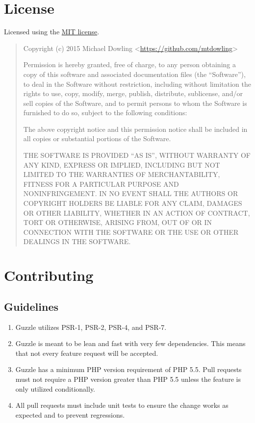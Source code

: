 \documentclass[a4paper,11pt,spanish]{sphinxmanual}
\begin{document}
\chapter{License}
\label{\detokenize{overview:license}}
Licensed using the \href{http://opensource.org/licenses/MIT}{MIT license}.
\begin{quote}

Copyright (c) 2015 Michael Dowling \textless{}\url{https://github.com/mtdowling}\textgreater{}

Permission is hereby granted, free of charge, to any person obtaining a copy
of this software and associated documentation files (the ``Software''), to deal
in the Software without restriction, including without limitation the rights
to use, copy, modify, merge, publish, distribute, sublicense, and/or sell
copies of the Software, and to permit persons to whom the Software is
furnished to do so, subject to the following conditions:

The above copyright notice and this permission notice shall be included in
all copies or substantial portions of the Software.

THE SOFTWARE IS PROVIDED ``AS IS'', WITHOUT WARRANTY OF ANY KIND, EXPRESS OR
IMPLIED, INCLUDING BUT NOT LIMITED TO THE WARRANTIES OF MERCHANTABILITY,
FITNESS FOR A PARTICULAR PURPOSE AND NONINFRINGEMENT. IN NO EVENT SHALL THE
AUTHORS OR COPYRIGHT HOLDERS BE LIABLE FOR ANY CLAIM, DAMAGES OR OTHER
LIABILITY, WHETHER IN AN ACTION OF CONTRACT, TORT OR OTHERWISE, ARISING FROM,
OUT OF OR IN CONNECTION WITH THE SOFTWARE OR THE USE OR OTHER DEALINGS IN
THE SOFTWARE.
\end{quote}


\chapter{Contributing}
\label{\detokenize{overview:contributing}}

\section{Guidelines}
\label{\detokenize{overview:guidelines}}\begin{enumerate}
\item {} 
Guzzle utilizes PSR-1, PSR-2, PSR-4, and PSR-7.

\item {} 
Guzzle is meant to be lean and fast with very few dependencies. This means
that not every feature request will be accepted.

\item {} 
Guzzle has a minimum PHP version requirement of PHP 5.5. Pull requests must
not require a PHP version greater than PHP 5.5 unless the feature is only
utilized conditionally.

\item {} 
All pull requests must include unit tests to ensure the change works as
expected and to prevent regressions.

\end{enumerate}
\end{document}
